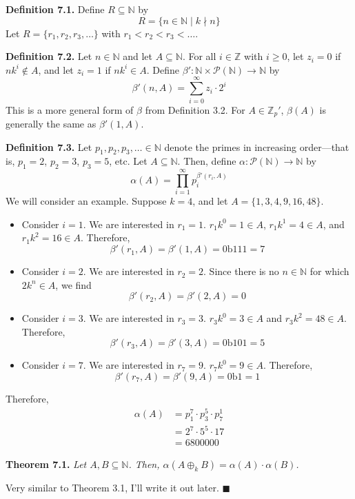 \documentclass{article}
\newcommand{\zee}{\mathbb{Z}}
\newcommand{\N}{\mathbb{N}}
\begin{document}
\textbf{Definition 7.1.} Define $R \subseteq \N$ by
\[R = \{n \in \N \mid k \nmid n\}\]
Let $R = \{r_1, r_2, r_3, \ldots\}$ with $r_1 < r_2 < r_3 < \ldots$.

\textbf{Definition 7.2.} Let $n \in \N$ and let $A \subseteq \N$.
For all $i \in \zee$
with $i \geq 0$, let $z_i = 0$ if $nk^i \not\in A$,
and let $z_i = 1$ if $nk^i \in A$.
Define $\beta': \N \times \mathcal{P}(\N) \rightarrow \N$
by
\[\beta'(n, A) = \sum_{i = 0}^\infty z_i \cdot 2^{i}\]
This is a more general form of $\beta$ from Definition 3.2.
For $A \in \zee_p'$, $\beta(A)$ is generally
the same as $\beta'(1, A)$.

\textbf{Definition 7.3.} Let
$p_1, p_2, p_3, \ldots \in \N$ denote the primes in increasing
order---that is, $p_1 = 2$, $p_2 = 3$, $p_3 = 5$, etc.
Let $A \subseteq \N$.
Then, define $\alpha: \mathcal{P}(\N) \rightarrow \N$ by
\[\alpha(A) = \prod_{i=1}^\infty p_i^{\beta'(r_i, A)}\]
We will consider an example. Suppose $k = 4$, and let
$A = \{1, 3, 4, 9, 16, 48\}$.
\begin{itemize}
    \item Consider $i = 1$. We are interested in $r_1 = 1$.
    $r_1k^0 = 1 \in A$,
    $r_1k^1 = 4 \in A$, and $r_1k^2 = 16 \in A$.
    Therefore,
    \[\beta'(r_1, A) = \beta'(1, A) = \text{0b111} = 7\]
    \item Consider $i = 2$. We are interested in $r_2 = 2$.
    Since there is no $n \in \N$ for which $2k^n \in A$,
    we find
    \[\beta'(r_2, A) = \beta'(2, A) = 0\]
    \item Consider $i = 3$. We are interested in $r_3 = 3$.
    $r_3k^0 = 3 \in A$ and $r_3k^2 = 48 \in A$.
    Therefore,
    \[\beta'(r_3, A) = \beta'(3, A) = \text{0b101} = 5\]
    \item Consider $i = 7$. We are interested in $r_7 = 9$.
    $r_7k^0 = 9 \in A$. Therefore,
    \[\beta'(r_7, A) = \beta'(9, A) = \text{0b1} = 1\]
\end{itemize}
Therefore,
\[\begin{split}
    \alpha(A) &= p_1^7 \cdot p_3^5 \cdot p_7^1 \\
    &= 2^7 \cdot 5^5 \cdot 17 \\
    &= 6800000
\end{split}\]

\textbf{Theorem 7.1.} \textit{Let $A, B \subseteq \N$.
Then, $\alpha(A \oplus_k B) = \alpha(A) \cdot \alpha(B)$.}

Very similar to Theorem 3.1, I'll write it out later.
$\blacksquare$
\end{document}
